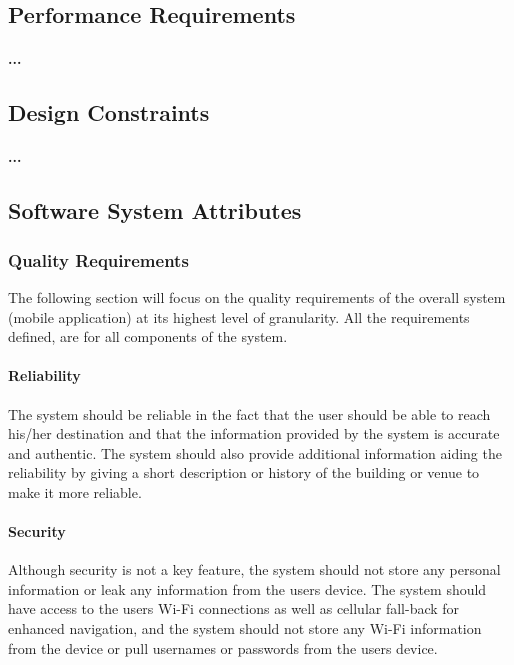\documentclass[runningheads,a4paper]{llncs}
\begin{document}
\subsection{Performance Requirements}
\paragraph{...}
\subsection{Design Constraints}
\paragraph{...}

 \subsection{Software System Attributes}
\subsubsection{Quality Requirements \\}
The following section will focus on the quality requirements of the overall system (mobile application) at its highest level of granularity. All the requirements defined, are for all components of the system.

\paragraph{Reliability \\}
The system should be reliable in the fact that the user should be able to reach his/her destination and that the information provided by the system is accurate and authentic. The system should also provide additional information aiding the reliability by giving a short description or history of the building or venue to make it more reliable. 

\paragraph{Security \\}
Although security is not a key feature, the system should not store any personal information or leak any information from the users device. The system should have access to the users Wi-Fi connections as well as cellular fall-back for enhanced navigation, and the system should not store any Wi-Fi information from the device or pull usernames or passwords from the users device. 
\end{document}
